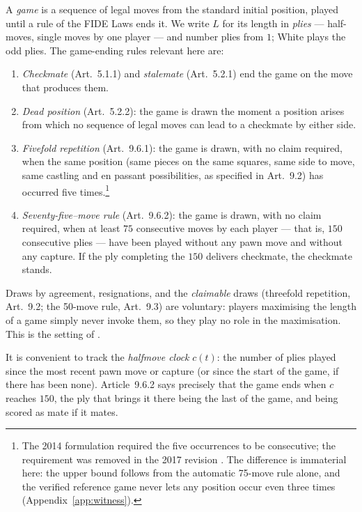 \documentclass[11pt]{article}
\theoremstyle{definition}
\theoremstyle{remark}
\theoremstyle{plain}
\newcommand{\clock}{c}
\begin{document}
A \emph{game} is a sequence of legal moves from the standard initial
position, played until a rule of the FIDE Laws \cite{fide2023laws} ends it.
We write $L$ for its length in \emph{plies} --- half-moves, single moves
by one player --- and number plies from $1$; White plays the odd plies.
The game-ending rules relevant here are:
\begin{enumerate}
  \item \emph{Checkmate} (Art.~5.1.1) and \emph{stalemate} (Art.~5.2.1) end
    the game on the move that produces them.
  \item \emph{Dead position} (Art.~5.2.2): the game is drawn the moment a
    position arises from which no sequence of legal moves can lead to a
    checkmate by either side.
  \item \emph{Fivefold repetition} (Art.~9.6.1): the game is drawn, with no
    claim required, when the same position (same pieces on the same squares,
    same side to move, same castling and en passant possibilities, as
    specified in Art.~9.2) has occurred five times.\footnote{The 2014 formulation
    required the five occurrences to be consecutive; the requirement was
    removed in the 2017 revision \cite{fide2017laws}. The difference is
    immaterial here: the upper bound follows from the automatic
    75-move rule alone, and the verified reference game never lets any
    position occur even three times (Appendix~\ref{app:witness}).}
  \item \emph{Seventy-five--move rule} (Art.~9.6.2): the game is drawn, with
    no claim required, when at least $75$ consecutive moves by each player
    --- that is, $150$ consecutive plies --- have been played without any
    pawn move and without any capture. If the ply completing the $150$
    delivers checkmate, the checkmate stands.
\end{enumerate}
Draws by agreement, resignations, and the \emph{claimable} draws (threefold
repetition, Art.~9.2; the 50-move rule, Art.~9.3) are voluntary: players
maximising the length of a game simply never invoke them, so they play no
role in the maximisation. This is the setting of \cite{murphy2020longest}.

It is convenient to track the \emph{halfmove clock} $\clock(t)$: the number
of plies played since the most recent pawn move or capture (or since the
start of the game, if there has been none). Article~9.6.2 says precisely
that the game ends when $\clock$ reaches $150$, the ply that brings it there
being the last of the game, and being scored as mate if it mates.
\end{document}
